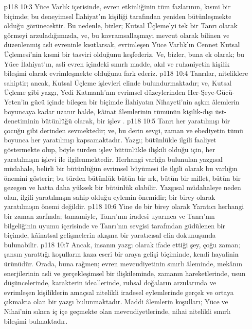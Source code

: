 \vs p118 10:3 Yüce Varlık içerisinde, evren etkinliğinin tüm fazlarının, kısmi bir biçimde; bu deneyimsel İlahiyat’ın kişiliği tarafından yeniden bütünleşmekte olduğu görünecektir. Bu nedenle, bizler; Kutsal Üçleme’yi tek bir Tanrı olarak görmeyi arzuladığımızda, ve, bu kavramsallaşmayı mevcut olarak bilinen ve düzenlenmiş asli evreninle kısıtlarsak, evrimleşen Yüce Varlık’ın Cennet Kutsal Üçlemesi’nin kısmi bir tasviri olduğunu keşfederiz. Ve, bizler, buna ek olarak; bu Yüce İlahiyat’ın, asli evren içindeki sınırlı madde, akıl ve ruhaniyetin kişilik bileşimi olarak evrimleşmekte olduğunu fark ederiz.
\vs p118 10:4 Tanrılar, niteliklere sahiptir; ancak, Kutsal Üçleme işlevleri elinde bulundurmaktadır; ve, Kutsal Üçleme gibi yazgı, Yedi Katmanlı’nın evrimsel düzeylerinden Her\hyp{}Şeye\hyp{}Gücü\hyp{}Yeten’in gücü içinde bileşen bir biçimde İlahiyatın Nihayeti’nin aşkın âlemlerin boyuncaya kadar uzanır halde, kâinat âlemlerinin tümünün kişilik\hyp{}dışı üst\hyp{}denetiminin bütünlüğü olarak, bir işlev .
\vs p118 10:5 Tanrı her yaratılmışı bir çocuğu gibi derinden sevmektedir; ve, bu derin sevgi, zaman ve ebediyetin tümü boyunca her yaratılmışı kapsamaktadır. Yazgı; bütünlükle ilgili faaliyet göstermekte olup, böyle türden işlev bütünlükle ilişkili olduğu için, her yaratılmışın işlevi ile ilgilenmektedir. Herhangi varlığa bulunulan yazgısal müdahale, belirli bir bütünlüğün evrimsel büyümesi ile ilgili olarak bu varlığın  önemini gösterir; bu türden bütünlük bütün bir ırk, bütün bir millet, bütün bir gezegen ve hatta daha yüksek bir bütünlük olabilir. Yazgısal müdahaleye neden olan, ilgili yaratılmışın sahip olduğu eylemin önemidir; bir birey olarak yaratılmışın önemi değildir.
\vs p118 10:6 Yine de bir birey olarak Yaratıcı herhangi bir zaman zarfında; tamamiyle, Tanrı’nın iradesi uyarınca ve Tanrı’nın bilgeliğinin uyumu içerisinde ve Tanrı’nın sevgisi tarafından güdülenen bir biçimde, kâinatsal gelişmelerin akışına bir yaratıcısal elin dokunuşunda bulunabilir.
\vs p118 10:7 Ancak, insanın yazgı olarak ifade ettiği şey, çoğu zaman; şansın yarattığı koşulların kaza eseri bir araya gelişi biçiminde, kendi hayalinin ürünüdür. Orada, buna rağmen; evren mevcudiyetinin sınırlı âleminde, mekânın enerjilerinin asli ve gerçekleşimsel bir ilişkileminde, zamanın hareketlerinde, usun düşüncelerinde, karakterin ideallerinde, ruhsal doğaların arzularında ve evrimleşen kişiliklerin amaçsal nitelikli iradesel eylemlerinde gerçek ve ortaya çıkmakta olan bir yazgı bulunmaktadır. Maddi âlemlerin koşulları; Yüce ve Nihai’nin sıkıca iç içe geçmekte olan mevcudiyetlerinde, nihai nitelikli sınırlı bileşimi bulmaktadır.
